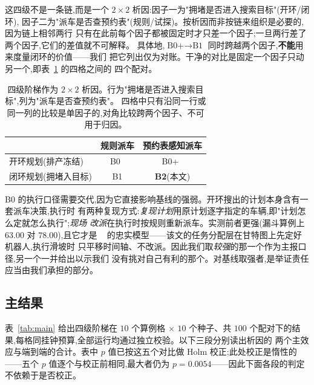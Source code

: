 \documentclass[manuscript,screen,review]{acmart}
\newcommand{\NCases}{10}
\newcommand{\NSeeds}{10}
\newcommand{\NPairs}{100}
\newcommand{\PProbeLoop}{=0.0054}
\begin{document}
这四级不是一条链,而是一个 $2\times 2$ 析因:因子一为"拥堵是否进入搜索目标"(开环/闭环),
因子二为"派车是否查预约表"(规则/试探)。按析因而非按链来组织是必要的,因为链上相邻两行
只有在此前每个因子都被固定时才只差一个因子;一旦两行差了两个因子,它们的差值就不可解释。
具体地,$\text{B0+}\to\text{B1}$ 同时跨越两个因子,\textbf{不能}用来度量闭环的价值——我们
把它列出仅为对账。干净的对比是固定一个因子只动另一个,即表~\ref{tab:arms} 的四格之间的
四个配对。

\begin{table}[t]
\caption{四级阶梯作为 $2\times 2$ 析因。行为"拥堵是否进入搜索目标",列为"派车是否查预约表"。
四格中只有沿同一行或同一列的比较是单因子的,对角比较跨两个因子、不可用于归因。}
\label{tab:arms}
\footnotesize
\begin{tabular}{@{}lcc@{}}
\toprule
 & 规则派车 & 预约表感知派车 \\
\midrule
开环规划(排产冻结) & B0~\cite{li2026framework} & B0+~\cite{sun2023integrated} \\
闭环规划(拥堵入目标) & B1 & \textbf{B2}(本文) \\
\bottomrule
\end{tabular}
\end{table}

B0 的执行口径需要交代,因为它直接影响基线的强弱。开环搜出的计划本身含有一套派车决策,执行时
有两种复现方式:\emph{复现计划}用原计划逐字指定的车辆,即"计划怎么定就怎么执行";\emph{现场
改派}在执行时按规则重新派车。实测前者更强(漏斗算例上 $63.00$ 对 $78.00$),且它才是
~\cite{li2026framework} 的忠实模型——该文的任务分配层在甘特图上先定好机器人,执行滑坡时
只平移时间轴、不改派。因此我们取\emph{较强}的那一个作为主报口径,另一个一并给出以示我们
没有挑对自己有利的那个。对基线取强者,是举证责任应当由我们承担的部分。

\subsection{主结果}
\label{sec:main}

表~\ref{tab:main} 给出四级阶梯在 $\NCases$ 个算例格 $\times$ $\NSeeds$ 个种子、共
$\NPairs$ 个配对下的结果,每格同挂钟预算,全部运行均通过独立校验。以下三段分别读出析因的
两个主效应与端到端的合计。表中 $p$ 值已按这五个对比做 Holm 校正;此处校正是惰性的——五个
$p$ 值逐个与校正前相同,最大者仍为 $p\PProbeLoop$——因此下面各段的判定不依赖于是否校正。
\end{document}
